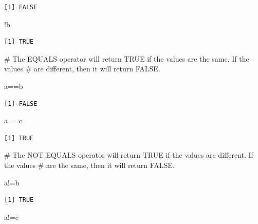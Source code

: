 \documentclass[
  letterpaper,
  DIV=11,
  numbers=noendperiod]{scrreprt}
\newenvironment{Shaded}{\begin{snugshade}}{\end{snugshade}}
\newcommand{\CommentTok}[1]{\textcolor[rgb]{0.37,0.37,0.37}{#1}}
\newcommand{\NormalTok}[1]{\textcolor[rgb]{0.00,0.23,0.31}{#1}}
\newcommand{\SpecialCharTok}[1]{\textcolor[rgb]{0.37,0.37,0.37}{#1}}
\begin{document}
\begin{verbatim}
[1] FALSE
\end{verbatim}

\begin{Shaded}
\begin{Highlighting}[]
\SpecialCharTok{!}\NormalTok{b}
\end{Highlighting}
\end{Shaded}

\begin{verbatim}
[1] TRUE
\end{verbatim}

\begin{Shaded}
\begin{Highlighting}[]
\CommentTok{\# The EQUALS operator will return TRUE if the values are the same. If the values}
\CommentTok{\# are different, then it will return FALSE.}

\NormalTok{a}\SpecialCharTok{==}\NormalTok{b}
\end{Highlighting}
\end{Shaded}

\begin{verbatim}
[1] FALSE
\end{verbatim}

\begin{Shaded}
\begin{Highlighting}[]
\NormalTok{a}\SpecialCharTok{==}\NormalTok{c}
\end{Highlighting}
\end{Shaded}

\begin{verbatim}
[1] TRUE
\end{verbatim}

\begin{Shaded}
\begin{Highlighting}[]
\CommentTok{\# The NOT EQUALS operator will return TRUE if the values are different. If the values}
\CommentTok{\# are the same, then it will return FALSE.}

\NormalTok{a}\SpecialCharTok{!=}\NormalTok{b}
\end{Highlighting}
\end{Shaded}

\begin{verbatim}
[1] TRUE
\end{verbatim}

\begin{Shaded}
\begin{Highlighting}[]
\NormalTok{a}\SpecialCharTok{!=}\NormalTok{c}
\end{Highlighting}
\end{Shaded}
\end{document}
